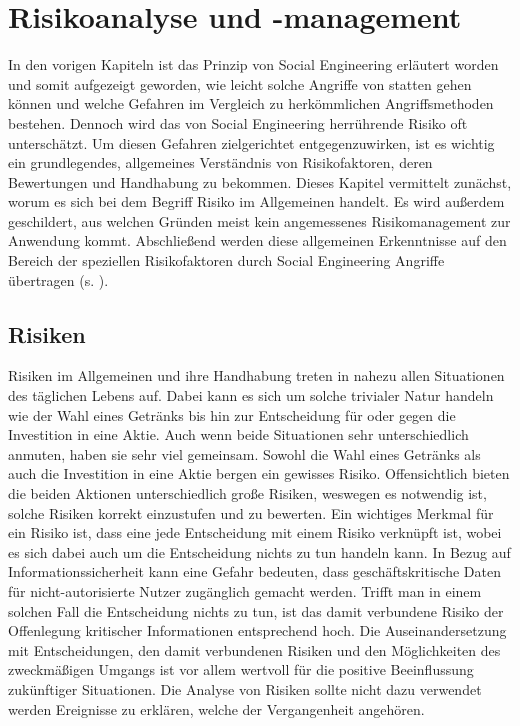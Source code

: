 \section{Risikoanalyse und -management}\label{sec:risikoanalyse}
In den vorigen Kapiteln ist das Prinzip von Social Engineering erläutert worden und somit aufgezeigt
geworden, wie leicht solche Angriffe von statten gehen können und welche Gefahren im Vergleich zu
herkömmlichen Angriffsmethoden bestehen.
Dennoch wird das von Social Engineering herrührende Risiko oft unterschätzt.
Um diesen Gefahren zielgerichtet entgegenzuwirken, ist es wichtig ein grundlegendes, allgemeines
Verständnis von Risikofaktoren, deren Bewertungen und Handhabung zu bekommen.
Dieses Kapitel vermittelt zunächst, worum es sich bei dem Begriff Risiko im Allgemeinen handelt.
Es wird außerdem geschildert, aus welchen Gründen meist kein angemessenes Risikomanagement
zur Anwendung kommt.
Abschließend werden diese allgemeinen Erkenntnisse auf den Bereich der speziellen Risikofaktoren durch
Social Engineering Angriffe übertragen (s. ).

\subsection{Risiken}\label{sec:allgemeines}
Risiken im Allgemeinen und ihre Handhabung treten in nahezu allen Situationen des täglichen Lebens
auf.
Dabei kann es sich um solche trivialer Natur handeln wie der Wahl eines Getränks bis hin
zur Entscheidung für oder gegen die Investition in eine Aktie.
Auch wenn beide Situationen sehr unterschiedlich anmuten, haben sie sehr viel gemeinsam.
Sowohl die Wahl eines Getränks als auch die Investition in eine Aktie bergen ein gewisses Risiko.
Offensichtlich bieten die beiden Aktionen unterschiedlich große Risiken, weswegen es notwendig ist,
solche Risiken korrekt einzustufen und zu bewerten.
Ein wichtiges Merkmal für ein Risiko ist, dass eine jede Entscheidung mit einem Risiko verknüpft ist,
wobei es sich dabei auch um die Entscheidung nichts zu tun handeln kann.
In Bezug auf Informationssicherheit kann eine Gefahr bedeuten, dass geschäftskritische Daten für
nicht-autorisierte Nutzer zugänglich gemacht werden.
Trifft man in einem solchen Fall die Entscheidung nichts zu tun, ist das damit verbundene Risiko der Offenlegung kritischer Informationen entsprechend hoch.
Die Auseinandersetzung mit Entscheidungen, den damit verbundenen Risiken und den Möglichkeiten des
zweckmäßigen Umgangs ist vor allem wertvoll für die positive Beeinflussung zukünftiger Situationen.
Die Analyse von Risiken sollte nicht dazu verwendet werden Ereignisse zu erklären, welche der
Vergangenheit angehören.


